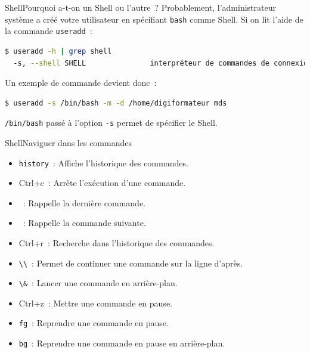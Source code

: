 \documentclass{beamer}
\begin{document}
    \begin{frame}[fragile]{Shell}{Pourquoi a-t-on un Shell ou l'autre~?}
        Probablement, l'administrateur système a créé votre utilisateur en spécifiant \lstinline{bash} comme Shell.
        \bigbreak
        Si on lit l'aide de la commande \lstinline{useradd}~:
        \begin{lstlisting}[language=bash]
$ useradd -h | grep shell
  -s, --shell SHELL               interpréteur de commandes de connexion du nouveau compte
        \end{lstlisting}
        \bigbreak
        Un exemple de commande devient donc~:
        \begin{lstlisting}[language=bash]
$ useradd -s /bin/bash -m -d /home/digiformateur mds
        \end{lstlisting}
        \bigbreak
        \lstinline{/bin/bash} passé à l'option \lstinline{-s} permet de spécifier le Shell.
    \end{frame}

    \begin{frame}{Shell}{Naviguer dans les commandes}
        \begin{itemize}
            \item \lstinline{history}~: Affiche l'historique des commandes.
            \item Ctrl+c~: Arrête l'exécution d'une commande.
            \item {}~: Rappelle la dernière commande.
            \item {}~: Rappelle la commande suivante.
            \item Ctrl+r~: Recherche dans l'historique des commandes.
            \item \lstinline{\\}~: Permet de continuer une commande sur la ligne d'après.
            \item \lstinline{\&}~: Lancer une commande en arrière-plan.
            \item Ctrl+z~: Mettre une commande en pause.
            \item \lstinline{fg}~: Reprendre une commande en pause.
            \item \lstinline{bg}~: Reprendre une commande en pause en arrière-plan.
        \end{itemize}
    \end{frame}
\end{document}
